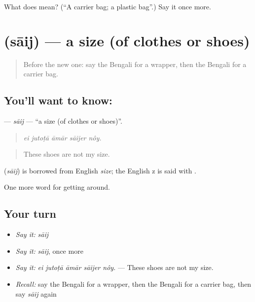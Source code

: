 \begin{tcolorbox}[breakable,colback=teal!4,colframe=teal!35!black,title={Before you move on}]
What does  mean? (\textquotedblleft{}A carrier bag; a plastic bag\textquotedblright{}.) Say it once more.
\end{tcolorbox}
\section[\texorpdfstring{\bn{সাইজ} (sāij)}{সাইজ (sāij)}]{ (sāij) — a size (of clothes or shoes)}

\label{lesson:BN-C423-saij}



\begin{quote}
Before the new one: say the Bengali for a wrapper, then the Bengali for a carrier bag.
\end{quote}

\subsection*{You'll want to know: }
\textbf{} — \emph{sāij} — \textquotedblleft{}a size (of clothes or shoes)\textquotedblright{}.

\begin{quote}
    
\end{quote}

\begin{quote}
\emph{ei jutoṭā āmār sāijer nôy.}
\end{quote}

\begin{quote}
These shoes are not my size.
\end{quote}

\begin{cousinweb}
\textbf{} (\emph{sāij}) is borrowed from English \emph{size}; the English z is said with .
\end{cousinweb}

\begin{grammarlens}[title={What you've built}]
One more word for getting around.
\end{grammarlens}

\subsection*{Your turn}
\begin{itemize}
\raggedright
  \item \emph{Say it:} \emph{sāij}
  \item \emph{Say it:} \emph{sāij}, once more
  \item \emph{Say it:} \emph{ei jutoṭā āmār sāijer nôy.} — These shoes are not my size.
  \item \emph{Recall:} say the Bengali for a wrapper, then the Bengali for a carrier bag, then say \emph{sāij} again
\end{itemize}

